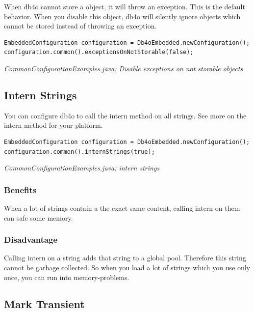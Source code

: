 When db4o cannot store a object, it will throw an exception. This is the default behavior. When you disable this object, db4o will silently ignore objects which cannot be stored instead of throwing an exception.

\begin{lstlisting}
EmbeddedConfiguration configuration = Db4oEmbedded.newConfiguration();
configuration.common().exceptionsOnNotStorable(false);
\end{lstlisting}

{\small\itshape CommonConfigurationExamples.java: Disable exceptions on not storable objects\par}
\medskip

\subsection{Intern Strings}
\label{ref:configuration-common-intern-strings}

You can configure db4o to call the intern method on all strings. See more on the intern method for your platform.

\begin{lstlisting}
EmbeddedConfiguration configuration = Db4oEmbedded.newConfiguration();
configuration.common().internStrings(true);
\end{lstlisting}

{\small\itshape CommonConfigurationExamples.java: intern strings\par}
\medskip

\subsubsection*{Benefits}

When a lot of strings contain a the exact same content, calling intern on them can safe some memory.

\subsubsection*{Disadvantage}

Calling intern on a string adds that string to a global pool. Therefore this string cannot be garbage collected. So when you load a lot of strings which you use only once, you can run into memory-problems.

\subsection{Mark Transient}
\label{ref:configuration-common-mark-transient}

